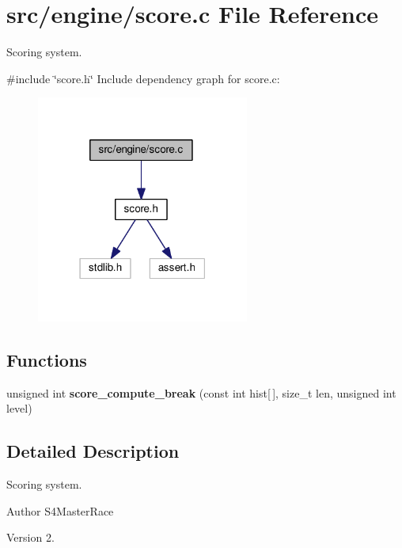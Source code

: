 \section{src/engine/score.c File Reference}
\label{score_8c}


Scoring system.  


{\ttfamily \#include \char`\"{}score.\+h\char`\"{}}\newline
Include dependency graph for score.\+c\+:
\nopagebreak
\begin{figure}[H]
\begin{center}
\leavevmode
\includegraphics[width=198pt]{score_8c__incl}
\end{center}
\end{figure}
\subsection*{Functions}
\begin{DoxyCompactItemize}
\item 
unsigned int \textbf{ score\+\_\+compute\+\_\+break} (const int hist[$\,$], size\+\_\+t len, unsigned int level)
\end{DoxyCompactItemize}


\subsection{Detailed Description}
Scoring system. 

\begin{DoxyAuthor}{Author}
S4\+Master\+Race 
\end{DoxyAuthor}
\begin{DoxyVersion}{Version}
2. 
\end{DoxyVersion}


